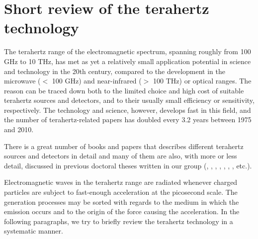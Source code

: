 \section{Short review of the terahertz technology}
The terahertz range of the electromagnetic spectrum, spanning roughly from 100 GHz to 10 THz, has met as yet a relatively small application potential in science and technology in the 20th century, compared to the development in the microwave ($<$ 100 GHz) and near-infrared ($>$ 100 THz) or optical ranges. The reason can be traced down both to the limited choice and high cost of suitable terahertz sources and detectors, and to their usually small efficiency or sensitivity, respectively. The technology and science, however, develops fast in this field, and the number of terahertz-related papers has doubled every 3.2 years \cite{lewis2014review} between 1975 and 2010.  

There is a great number of books and papers that describes different terahertz sources and detectors in detail \cite[pp. 155-158]{lee2008book}\cite{sullivan2012field,lewis2014review}
and many of them are also, with more or less detail, discussed in previous doctoral theses written in our group (\cite[pp. 2-30]{pashkin2004phd}, \cite[pp. 19-25]{nemec2006phd}, \cite[pp. 7-26]{fekete2008phd}, \cite[pp. 11-21]{sibik2010dp}, \cite[pp. 31-45]{yahiaoui2011phd}, \cite[pp. 33-38]{mics2012phd}, \cite[pp. 25-33]{skoromets2013phd}, etc.).

Electromagnetic waves in the terahertz range are radiated whenever charged particles are subject to fast-enough acceleration at the picosecond scale.  The generation processes may be sorted with regards to the medium in which the emission occurs and to the origin of the force causing the acceleration.  In the following paragraphs, we try to briefly review the terahertz technology in a systematic manner.

